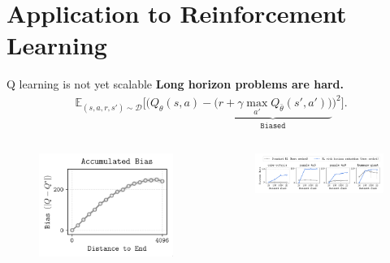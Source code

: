 \documentclass{beamer}
\begin{document}
\section{Application to Reinforcement Learning}
\begin{frame}{Q learning is not yet scalable \cite{parkQlearningNotScalable2025}}
    \textbf{Long horizon problems are hard.}
    \begin{align*}
\mathbb{E}_{(s,a,r,s')\sim \mathcal{D}}\bigg[\Big(Q_\theta(s,a)-\underbrace{\big(r+\gamma \max_{a'}Q_{\bar{\theta}}(s',a')\big)}_{\texttt{Biased}}\Big)^2\bigg]
    .\end{align*}
    \begin{columns}
        \hspace*{-1cm}
        \begin{column}{0.3\linewidth}
        \begin{figure}
            \centering
            \includegraphics[width=\linewidth]{figures/bias_accumulation.png}
        \end{figure}
       \end{column} 
       \hspace*{-1cm}
       \begin{column}{0.69\linewidth}
        \vspace*{-.5cm}
        \begin{figure}
            \centering
            \includegraphics[width=1.1\linewidth]{figures/horizon-reduction.png}
        \end{figure}
       \end{column}
    \end{columns}
\end{frame}
\end{document}
